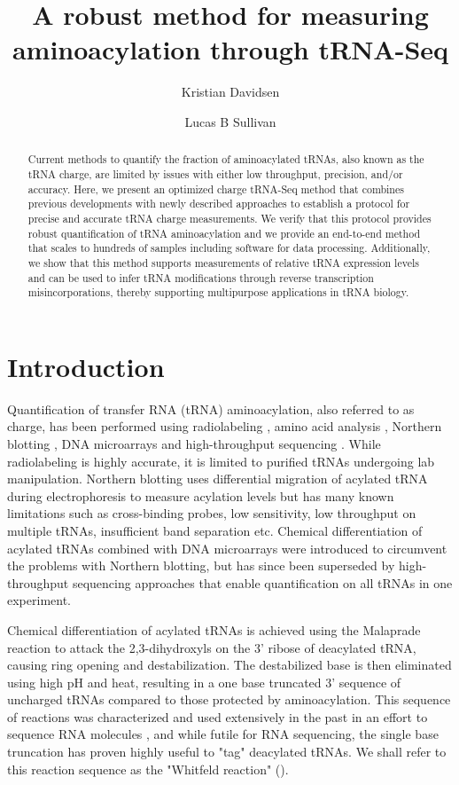 \documentclass[9pt,lineno]{elife}
\title{A robust method for measuring aminoacylation through tRNA-Seq}
\author[1,2]{Kristian Davidsen}
\author[1*]{Lucas B Sullivan}
\affil[1]{Human Biology Division, Fred Hutchinson Cancer Center, United States}
\affil[2]{Molecular and Cellular Biology Program, University of Washington, United States}
\begin{document}
\maketitle

\begin{abstract}
Current methods to quantify the fraction of aminoacylated tRNAs, also known as the tRNA charge, are limited by issues with either low throughput, precision, and/or accuracy.
Here, we present an optimized charge tRNA-Seq method that combines previous developments with newly described approaches to establish a protocol for precise and accurate tRNA charge measurements.
We verify that this protocol provides robust quantification of tRNA aminoacylation and we provide an end-to-end method that scales to hundreds of samples including software for data processing.
Additionally, we show that this method supports measurements of relative tRNA expression levels and can be used to infer tRNA modifications through reverse transcription misincorporations, thereby supporting multipurpose applications in tRNA biology.
\end{abstract}






\section{Introduction}
Quantification of transfer RNA (tRNA) aminoacylation, also referred to as charge, has been performed using radiolabeling \citep{Wolfson2002-gp}, amino acid analysis \citep{Hill1986-nr}, Northern blotting \citep{Ho1987-ug, Varshney1991-zp, Stenum2017-wn}, DNA microarrays \citep{Dittmar2005-va} and high-throughput sequencing \citep{Evans2017-st}.
While radiolabeling is highly accurate, it is limited to purified tRNAs undergoing lab manipulation.
Northern blotting uses differential migration of acylated tRNA during electrophoresis to measure acylation levels but has many known limitations such as cross-binding probes, low sensitivity, low throughput on multiple tRNAs, insufficient band separation etc.
Chemical differentiation of acylated tRNAs combined with DNA microarrays were introduced to circumvent the problems with Northern blotting, but has since been superseded by high-throughput sequencing approaches that enable quantification on all tRNAs in one experiment.

Chemical differentiation of acylated tRNAs is achieved using the Malaprade reaction to attack the 2,3-dihydroxyls on the 3’ ribose of deacylated tRNA, causing ring opening and destabilization.
The destabilized base is then eliminated using high pH and heat, resulting in a one base truncated 3' sequence of uncharged tRNAs compared to those protected by aminoacylation.
This sequence of reactions was characterized and used extensively in the past in an effort to sequence RNA molecules \citep{Whitfeld1953-ca, Whitfeld1954-wl, Khym1961-xf, Neu1964-hu}, and while futile for RNA sequencing, the single base truncation has proven highly useful  to "tag" deacylated tRNAs.
We shall refer to this reaction sequence as the "Whitfeld reaction" ().
\end{document}
